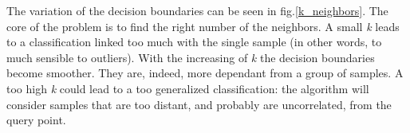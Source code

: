 \documentclass[10pt,a4paper]{article}
\begin{document}
	The variation of the decision boundaries can be seen in fig.\ref{k_neighbors}. The core of the problem is to find the right number of the neighbors. A small \emph{k} leads to a classification linked too much with the single sample (in other words, to much sensible to outliers). With the increasing of \emph{k} the decision boundaries become smoother. They are, indeed, more dependant from a group of samples. A too high \emph{k} could lead to a too generalized classification: the algorithm will consider samples that are too distant, and probably are uncorrelated, from the query point.
	
	\begin{figure}[hp]
		\qquad\qquad
		\qquad\qquad
		\qquad\qquad
		\qquad\qquad

\end{figure}
\end{document}
